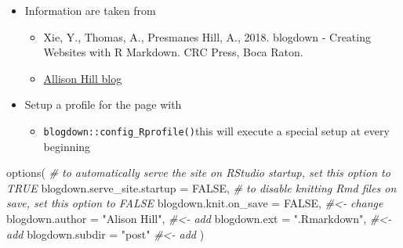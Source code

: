 \documentclass[
]{article}
\newenvironment{Shaded}{\begin{snugshade}}{\end{snugshade}}
\newcommand{\AttributeTok}[1]{\textcolor[rgb]{0.77,0.63,0.00}{#1}}
\newcommand{\CommentTok}[1]{\textcolor[rgb]{0.56,0.35,0.01}{\textit{#1}}}
\newcommand{\ConstantTok}[1]{\textcolor[rgb]{0.00,0.00,0.00}{#1}}
\newcommand{\FunctionTok}[1]{\textcolor[rgb]{0.00,0.00,0.00}{#1}}
\newcommand{\NormalTok}[1]{#1}
\newcommand{\StringTok}[1]{\textcolor[rgb]{0.31,0.60,0.02}{#1}}
\providecommand{\tightlist}{%
  \setlength{\itemsep}{0pt}\setlength{\parskip}{0pt}}
\begin{document}
\begin{itemize}
\tightlist
\item
  Information are taken from

  \begin{itemize}
  \tightlist
  \item
    Xie, Y., Thomas, A., Presmanes Hill, A., 2018. blogdown -
    Creating Websites with R Markdown. CRC Press, Boca Raton.
  \item
    \href{https://alison.rbind.io/post/new-year-new-blogdown/\#pre-requisites}{Allison Hill
    blog}
  \end{itemize}
\item
  Setup a profile for the page with

  \begin{itemize}
  \tightlist
  \item
    \texttt{blogdown::config\_Rprofile()}this will execute a special setup
    at every beginning
  \end{itemize}
\end{itemize}

\begin{Shaded}
\begin{Highlighting}[]

\FunctionTok{options}\NormalTok{(}
  \CommentTok{\# to automatically serve the site on RStudio startup, set this option to TRUE}
  \AttributeTok{blogdown.serve\_site.startup =} \ConstantTok{FALSE}\NormalTok{,}
  \CommentTok{\# to disable knitting Rmd files on save, set this option to FALSE}
  \AttributeTok{blogdown.knit.on\_save =} \ConstantTok{FALSE}\NormalTok{,     }\CommentTok{\#\textless{}{-} change}
  \AttributeTok{blogdown.author =} \StringTok{"Alison Hill"}\NormalTok{,  }\CommentTok{\#\textless{}{-} add}
  \AttributeTok{blogdown.ext =} \StringTok{".Rmarkdown"}\NormalTok{,      }\CommentTok{\#\textless{}{-} add}
  \AttributeTok{blogdown.subdir =} \StringTok{"post"}          \CommentTok{\#\textless{}{-} add}
\NormalTok{)}
\end{Highlighting}
\end{Shaded}
\end{document}
